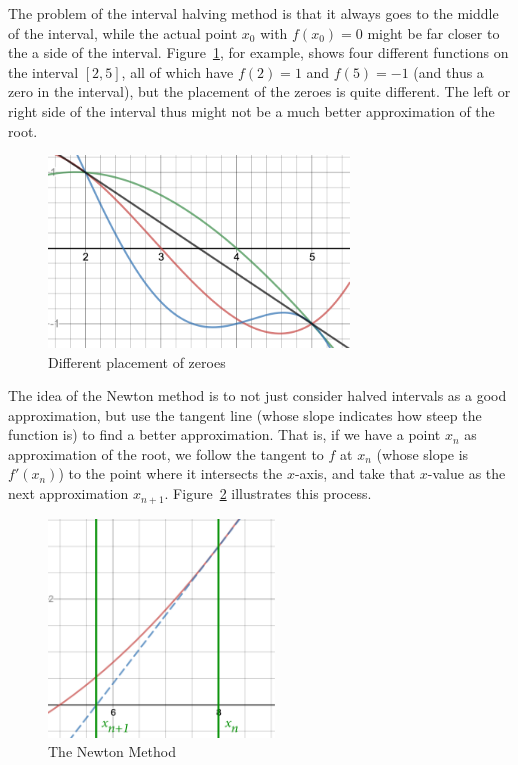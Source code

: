 The problem of the interval halving method is that it always goes to the
middle of the interval, while the actual point $x_0$ with $f(x_0)=0$ might
be far closer to the a side of the interval. Figure~\ref{fignewton4}, for
example, shows four different functions on the interval $[2,5]$, all of
which have $f(2)=1$ and $f(5)=-1$ (and thus a zero in the interval), but the
placement of the zeroes is quite different. The left or right side of the
interval thus might not be a much better approximation of the root.
\begin{figure}
\begin{center}
\includegraphics[width=8cm]{pic/newton4.png}
\end{center}
\caption{Different placement of zeroes}
\label{fignewton4}
\end{figure}

The idea of the Newton method is to not just consider halved intervals
as a good approximation, but use the tangent line (whose slope
indicates how steep the function is) to find a better
approximation. That
is, if we have a point $x_n$ as approximation of the root, we follow the
tangent to $f$ at $x_n$ (whose slope is $f'(x_n)$) to the point where it
intersects the $x$-axis, and take that $x$-value as the next approximation
$x_{n+1}$. Figure~\ref{fignewtonm} illustrates this process.

\begin{figure}
\begin{center}
\includegraphics[width=6cm]{pic/newtonmeth.pdf}
\end{center}
\caption{The Newton Method}
\label{fignewtonm}
\end{figure}


